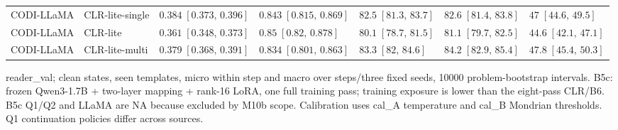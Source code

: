 \begin{table}[t]
{\begin{tabular}{lllllll}
CODI-LLaMA & CLR-lite-single & $0.384\;[0.373,\,0.396]$ & $0.843\;[0.815,\,0.869]$ & $82.5\;[81.3,\,83.7]$ & $82.6\;[81.4,\,83.8]$ & $47\;[44.6,\,49.5]$ \\
CODI-LLaMA & CLR-lite & $0.361\;[0.348,\,0.373]$ & $0.85\;[0.82,\,0.878]$ & $80.1\;[78.7,\,81.5]$ & $81.1\;[79.7,\,82.5]$ & $44.6\;[42.1,\,47.1]$ \\
CODI-LLaMA & CLR-lite-multi & $0.379\;[0.368,\,0.391]$ & $0.834\;[0.801,\,0.863]$ & $83.3\;[82,\,84.6]$ & $84.2\;[82.9,\,85.4]$ & $47.8\;[45.4,\,50.3]$ \\
\bottomrule
\end{tabular}}
\par\smallskip\parbox{\textwidth}{\scriptsize reader\_val; clean states, seen templates, micro within step and macro over steps/three fixed seeds, 10000 problem-bootstrap intervals. B5c: frozen Qwen3-1.7B + two-layer mapping + rank-16 LoRA, one full training pass; training exposure is lower than the eight-pass CLR/B6. B5c Q1/Q2 and LLaMA are NA because excluded by M10b scope. Calibration uses cal\_A temperature and cal\_B Mondrian thresholds. Q1 continuation policies differ across sources.}
\end{table}
